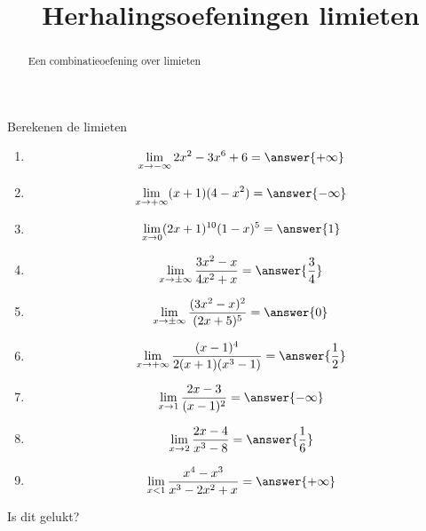 \documentclass{ximera}
\title{Herhalingsoefeningen limieten}
\begin{document}
  
\begin{abstract}  
Een combinatieoefening over limieten
\end{abstract}  
\maketitle  
 
\begin{question}  
  Berekenen de limieten 
  \begin{enumerate}
      \item \[ \lim \limits_{x \to -\infty} 2x^2-3x^6+6= \answer{+\infty}\]
      \item \[ \lim \limits_{x \to +\infty} (x+1)(4-x^2)= \answer{-\infty}\]
      \item \[\lim \limits_{x \to 0} (2x+1)^{10} (1-x)^5=\answer{1}\]
      \item \[\lim \limits_{x \to \pm \infty} \dfrac{3x^2-x}{4x^2+x}= \answer{\dfrac{3}{4}}\]
      \item \[\lim \limits_{x \to \pm \infty} \dfrac{(3x^2-x)^2}{(2x+5)^5} = \answer{0}\]
      \item \[\lim \limits_{x \to + \infty} \dfrac{(x-1)^4}{2(x+1)(x^3-1)}= \answer{\dfrac{1}{2}}\]
      \item \[\lim \limits_{x \to 1} \dfrac{2x-3}{(x-1)^2}= \answer{-\infty}\]
      \item \[\lim \limits_{x \to 2} \dfrac{2x-4}{x^3-8}= \answer{\dfrac{1}{6}}\]
      \item \[\lim \limits_{x < 1} \dfrac{x^4-x^3}{x^3-2x^2+x}= \answer{+\infty}\]
  \end{enumerate} 
\end{question}  
Is dit gelukt?
\end{document}
